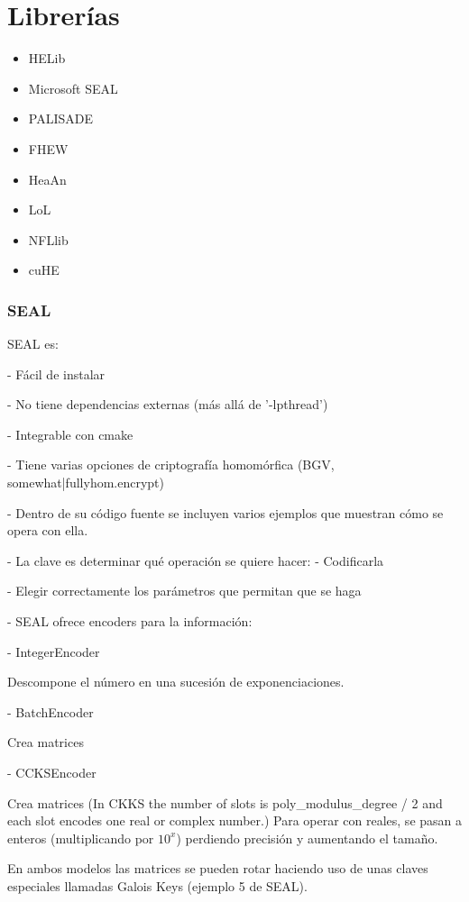 \chapter{Librerías}

\begin{itemize}
    \item HELib
    \item Microsoft SEAL
    \item PALISADE
    \item FHEW
    \item HeaAn
    \item LoL
    \item NFLlib
    \item cuHE
\end{itemize}{}

\subsection{SEAL}

SEAL es:

- Fácil de instalar

- No tiene dependencias externas (más allá de '-lpthread')

- Integrable con cmake

- Tiene varias opciones de criptografía homomórfica (BGV, {somewhat|fully}hom.encrypt)

- Dentro de su código fuente se incluyen varios ejemplos que muestran cómo se opera con ella.

- La clave es determinar qué operación se quiere hacer:
    - Codificarla
    
    - Elegir correctamente los parámetros que permitan que se haga

- SEAL ofrece encoders para la información:

    - IntegerEncoder
    
    Descompone el número en una sucesión de exponenciaciones.
    
    - BatchEncoder
    
    Crea matrices
    
    - CCKSEncoder
    
    Crea matrices (In CKKS the number of slots is poly\_modulus\_degree / 2 and each slot encodes one real or complex number.) Para operar con reales, se pasan a enteros (multiplicando por $10^x$) perdiendo precisión y aumentando el tamaño. 


En ambos modelos las matrices se pueden rotar haciendo uso de unas claves especiales llamadas Galois Keys (ejemplo 5 de SEAL).

